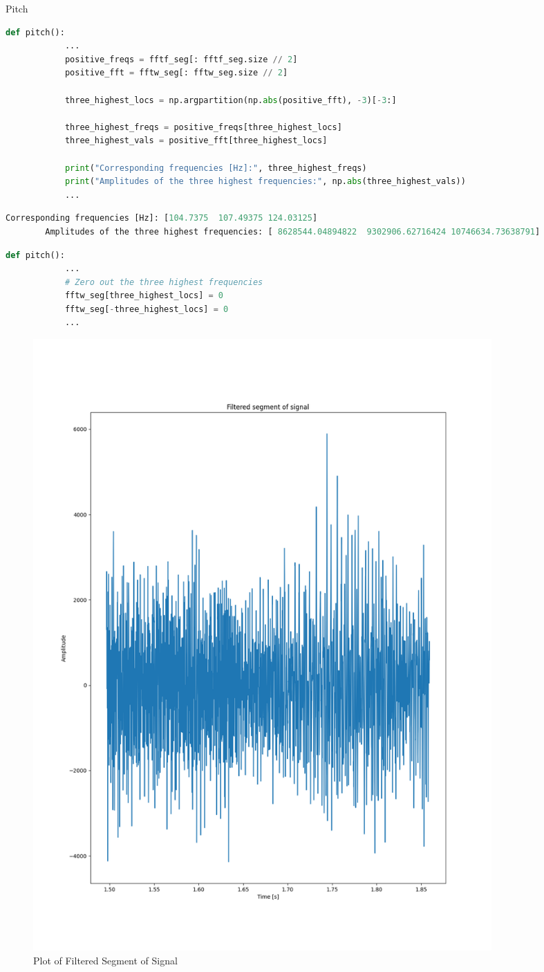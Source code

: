 \begin{hwkProblem}{6.2}{Pitch}
	\newpage
	\solpart

	\begin{lstlisting}[language=python]
		def pitch():
			...
			positive_freqs = fftf_seg[: fftf_seg.size // 2]
			positive_fft = fftw_seg[: fftw_seg.size // 2]

			three_highest_locs = np.argpartition(np.abs(positive_fft), -3)[-3:]

			three_highest_freqs = positive_freqs[three_highest_locs]
			three_highest_vals = positive_fft[three_highest_locs]

			print("Corresponding frequencies [Hz]:", three_highest_freqs)
			print("Amplitudes of the three highest frequencies:", np.abs(three_highest_vals))
			...
	\end{lstlisting}

	\begin{lstlisting}[language=python]
		Corresponding frequencies [Hz]: [104.7375  107.49375 124.03125]
		Amplitudes of the three highest frequencies: [ 8628544.04894822  9302906.62716424 10746634.73638791]
	\end{lstlisting}

	\newpage
	\solpart

	\begin{lstlisting}[language=python]
		def pitch():
			...
			# Zero out the three highest frequencies
			fftw_seg[three_highest_locs] = 0
			fftw_seg[-three_highest_locs] = 0
			...
	\end{lstlisting}

	\newpage
	\solpart

	\begin{figure}[ht!]
	  \centering
	  \includegraphics[width=0.85\textwidth]{./6.2.6.png}
	  \caption{Plot of Filtered Segment of Signal}
	\end{figure}


\end{hwkProblem}
